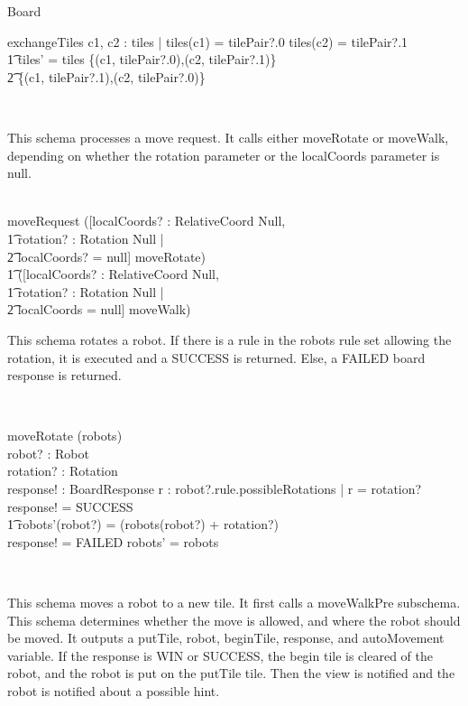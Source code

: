 \documentclass[12pt]{article}
\begin{document}
\begin{class}{Board}
\begin{schema}{exchangeTiles}
\also \also \also
\exists c1, c2 : \dom tiles | tiles(c1) = tilePair?.0 \wedge tiles(c2) = tilePair?.1 \; \; \wedge \\ \t1
tiles' = tiles \setminus \{(c1, tilePair?.0),(c2, tilePair?.1)\} \cup \\ \t2 \{(c1, tilePair?.1),(c2, tilePair?.0)\}
\end{schema} \\
\znewpage
\begin{zpar}
This schema processes a move request. It calls either moveRotate or moveWalk, depending on whether the rotation parameter or the localCoords parameter is null.
\end{zpar} \\
moveRequest \sdef ([localCoords? : RelativeCoord \cup Null, \\ \t1 rotation? : Rotation \cup Null | \\ \t2 localCoords? = null] \wedge moveRotate) \; \; [] \\ \t1
([localCoords? : RelativeCoord \cup Null, \\ \t1 rotation? : Rotation \cup Null | \\ \t2 localCoords = null] \wedge moveWalk) \\
\begin{zpar}
This schema rotates a robot. If there is a rule in the robots rule set allowing the rotation, it is executed and a SUCCESS is returned. Else, a FAILED board response is returned.
\end{zpar} \\
\begin{schema}{moveRotate}
\Delta(robots) \\
robot? : Robot \\
rotation? : Rotation \\
response! : BoardResponse
\where
\IF \exists r : robot?.rule.possibleRotations | r = rotation?\\
\THEN response! = SUCCESS \; \; \wedge \\ \t1
robots'(robot?) = (robots(robot?) + rotation?)  \\
\ELSE response! = FAILED \wedge robots' = robots
\end{schema} \\
\znewpage
\begin{zpar}
This schema moves a robot to a new tile. It first calls a moveWalkPre subschema. This schema determines whether the move is allowed, and where the robot should be moved. It outputs a putTile, robot, beginTile, response, and autoMovement variable. If the response is WIN or SUCCESS, the begin tile is cleared of the robot, and the robot is put on the putTile tile. Then the view is notified and the robot is notified about a possible hint.

\end{zpar}
\end{class}
\end{document}
